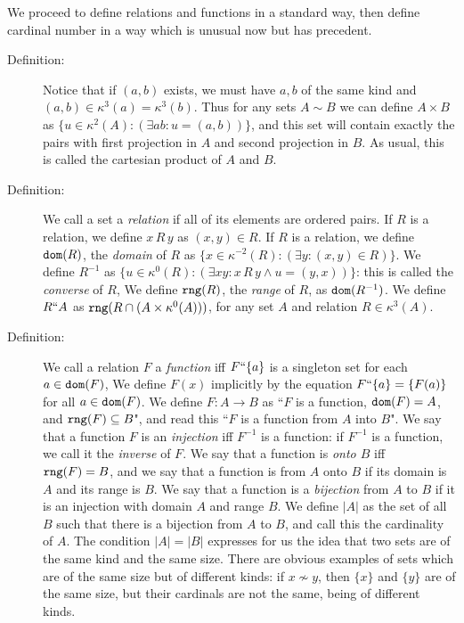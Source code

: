 \documentclass[12pt]{article}
\begin{document}
We proceed to define relations and functions in a standard way, then define cardinal number in a way which is unusual now but has precedent.

\begin{description}

\item[Definition:]  Notice that if $(a,b)$ exists, we must have $a,b$  of the same kind and $(a,b) \in \kappa^3(a) = \kappa^3(b)$.  Thus for any sets $A \sim B$ we can define $A \times B$ as
$\{u \in \kappa^2(A):(\exists ab:u=(a,b))\}$, and this set will contain exactly the pairs with first projection in $A$ and second projection in $B$.  As usual, this is called the cartesian product of $A$ and $B$.  

\item[Definition:]  We call a set a {\em relation\/} if all of its elements are ordered pairs.  If $R$ is a relation, we define $x \, R \, y$ as $(x,y)\in R$.  If $R$ is a relation, we define ${\tt dom}(R)$, the {\em  domain\/} of $R$ as $\{x \in \kappa^{-2}(R):(\exists y:(x,y)\in R)\}$.  We define $R^{-1}$ as $\{u \in \kappa^0(R):(\exists xy: x\, R \, y \wedge u = (y,x))\}$:  this is called the {\em converse\/} of $R$,  We define ${\tt rng}(R)$, the {\em range\/} of $R$, as ${\tt dom}(R^{-1})$.  We define $R``A$ as ${\tt rng}(R \cap (A \times \kappa^0(A)))$, for any set $A$ and relation $R \in \kappa^3(A)$.

\item[Definition:]  We call a relation $F$ a {\em function\/} iff
$F``\{a\}$ is a singleton set for each $a \in {\tt dom}(F)$,
We define $F(x)$ implicitly by the equation $F``\{a\} = \{F(a)\}$
for all $a \in {\tt dom}(F)$.  We define $F:A \rightarrow B$ as
``$F$ is a function, ${\tt dom}(F)=A$, and ${\tt rng}(F) \subseteq B$", and read this ``$F$ is a function from $A$ into $B$".  We say that a function $F$ is an {\em injection\/} iff $F^{-1}$ is a function:  if $F^{-1}$ is a function, we call it the {\em inverse\/} of $F$.  We say that a function is {\em onto $B$} iff ${\tt rng}(F)=B$, and we say that a function is from $A$ onto $B$ if its domain is $A$ and its range is $B$.  We say that a function is a {\em bijection\/} from $A$ to $B$ if it is an injection with domain $A$ and range $B$.  We define $|A|$ as the set of all $B$ such that there is a bijection from $A$ to $B$, and call this the cardinality of $A$.  The condition $|A|=|B|$ expresses for us the idea that two sets are of the same kind and the same size.  There are obvious examples of sets which are of the same size but of different kinds:  if $x \not\sim y$, then $\{x\}$ and $\{y\}$ are of the same size, but their cardinals are not the same, being of different kinds.



\end{description}
\end{document}
